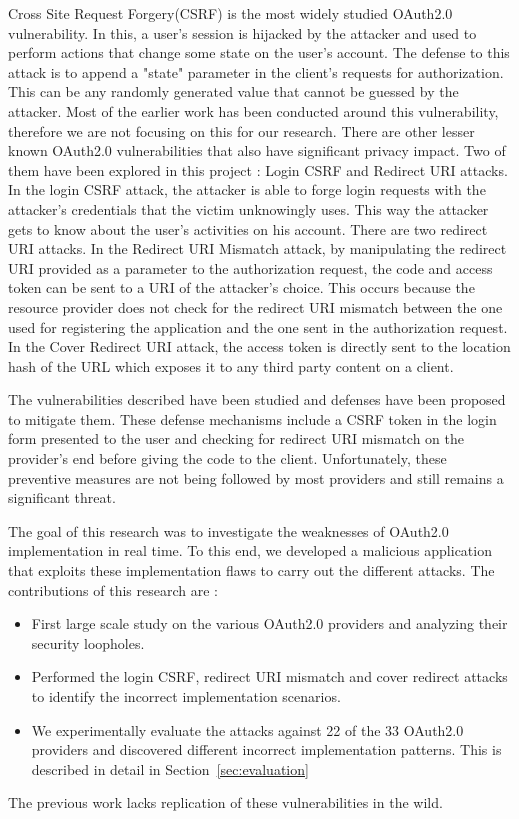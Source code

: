 Cross Site Request Forgery(CSRF) is the most widely studied OAuth2.0 vulnerability. In this, a user's session is hijacked by the attacker and used to perform actions that change some state on the user's account. The defense to this attack is to append a "state" parameter in the client's requests for authorization. This can be any randomly generated value that cannot be guessed by the attacker. Most of the earlier work has been conducted around this vulnerability, therefore we are not focusing on this for our research. There are other lesser known OAuth2.0 vulnerabilities that also have significant privacy impact. Two of them have been explored in this project : Login CSRF and Redirect URI attacks. In the login CSRF attack, the attacker is able to forge login requests with the attacker's credentials that the victim unknowingly uses. This way the attacker gets to know about the user's activities on his account. There are two redirect URI attacks. In the Redirect URI Mismatch attack, by manipulating the redirect URI provided as a parameter to the authorization request, the code and access token can be sent to a URI of the attacker's choice. This occurs because the resource provider does not check for the redirect URI mismatch between the one used for registering the application and the one sent in the authorization request.  In the Cover Redirect URI attack, the access token is directly sent to the location hash of the URL which exposes it to any third party content on a client. 

The vulnerabilities described have been studied and defenses have been proposed to mitigate them. These defense mechanisms include a CSRF token in the login form presented to the user and checking for redirect URI mismatch on the provider's end before giving the code to the client. Unfortunately, these preventive measures are not being followed by most providers and still remains a significant threat. 

The goal of this research was to investigate the weaknesses of OAuth2.0 implementation in real time.  To this end, we developed a malicious application that exploits these implementation flaws to carry out the different attacks. The contributions of this research are :
\begin{itemize}
\item First large scale study on the various OAuth2.0 providers and analyzing their security loopholes.
\item Performed the login CSRF, redirect URI mismatch and cover redirect attacks to identify the incorrect implementation scenarios.
\item We experimentally evaluate the attacks against 22 of the 33 OAuth2.0 providers and discovered different incorrect implementation patterns. This is described in detail in Section~\ref{sec:evaluation}
\end{itemize} The previous work lacks replication of these vulnerabilities in the wild. 


